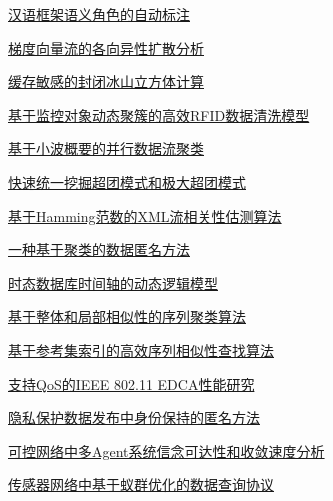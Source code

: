\documentclass[a4paper]{article}
\begin{document}
\href{http://www.jos.org.cn/ch/reader/download_pdf.aspx?file_no=3756&year_id=2010&quarter_id=4&falg=1}{汉语框架语义角色的自动标注}

\href{http://www.jos.org.cn/ch/reader/download_pdf.aspx?file_no=3523&year_id=2010&quarter_id=4&falg=1}{梯度向量流的各向异性扩散分析}

\href{http://www.jos.org.cn/ch/reader/download_pdf.aspx?file_no=3498&year_id=2010&quarter_id=4&falg=1}{缓存敏感的封闭冰山立方体计算}

\href{http://www.jos.org.cn/ch/reader/download_pdf.aspx?file_no=3565&year_id=2010&quarter_id=4&falg=1}{基于监控对象动态聚簇的高效RFID数据清洗模型}

\href{http://www.jos.org.cn/ch/reader/download_pdf.aspx?file_no=3570&year_id=2010&quarter_id=4&falg=1}{基于小波概要的并行数据流聚类}

\href{http://www.jos.org.cn/ch/reader/download_pdf.aspx?file_no=3595&year_id=2010&quarter_id=4&falg=1}{快速统一挖掘超团模式和极大超团模式}

\href{http://www.jos.org.cn/ch/reader/download_pdf.aspx?file_no=3430&year_id=2010&quarter_id=4&falg=1}{基于Hamming范数的XML流相关性估测算法}

\href{http://www.jos.org.cn/ch/reader/download_pdf.aspx?file_no=3508&year_id=2010&quarter_id=4&falg=1}{一种基于聚类的数据匿名方法}

\href{http://www.jos.org.cn/ch/reader/download_pdf.aspx?file_no=3511&year_id=2010&quarter_id=4&falg=1}{时态数据库时间轴的动态逻辑模型}

\href{http://www.jos.org.cn/ch/reader/download_pdf.aspx?file_no=3609&year_id=2010&quarter_id=4&falg=1}{基于整体和局部相似性的序列聚类算法}

\href{http://www.jos.org.cn/ch/reader/download_pdf.aspx?file_no=3610&year_id=2010&quarter_id=4&falg=1}{基于参考集索引的高效序列相似性查找算法}

\href{http://www.jos.org.cn/ch/reader/download_pdf.aspx?file_no=3490&year_id=2010&quarter_id=4&falg=1}{支持QoS的IEEE 802.11 EDCA性能研究}

\href{http://www.jos.org.cn/ch/reader/download_pdf.aspx?file_no=3466&year_id=2010&quarter_id=4&falg=1}{隐私保护数据发布中身份保持的匿名方法}

\href{http://www.jos.org.cn/ch/reader/download_pdf.aspx?file_no=3517&year_id=2010&quarter_id=4&falg=1}{可控网络中多Agent系统信念可达性和收敛速度分析}

\href{http://www.jos.org.cn/ch/reader/download_pdf.aspx?file_no=3509&year_id=2010&quarter_id=4&falg=1}{传感器网络中基于蚁群优化的数据查询协议}
\end{document}
